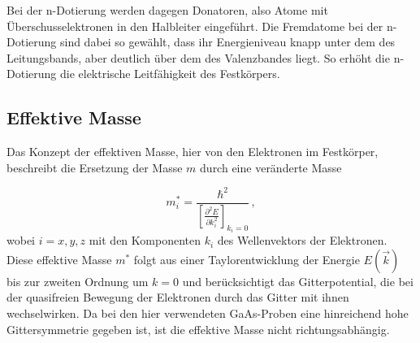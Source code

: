 Bei der n-Dotierung werden dagegen Donatoren, also Atome mit Überschusselektronen in den Halbleiter eingeführt.
Die Fremdatome bei der  n-Dotierung sind dabei so gewählt, dass ihr Energieniveau knapp unter dem des Leitungsbands,
aber deutlich über dem des Valenzbandes liegt.
So erhöht die n-Dotierung die elektrische Leitfähigkeit des Festkörpers.


\subsection{Effektive Masse}

Das Konzept der effektiven Masse, hier von den Elektronen im Festkörper, beschreibt die Ersetzung der Masse $m$ durch eine veränderte Masse

\begin{equation}
    m^*_i = \frac{\hbar^2}{\left[\frac{\partial^2 E}{\partial k^2_i} \right]_{k_i=0}} \,,
    \label{eq:effektivemasse}
\end{equation}
wobei $i = x,y,z$ mit den Komponenten $k_i$ des Wellenvektors der Elektronen.
Diese effektive Masse $m^*$ folgt aus einer Taylorentwicklung der Energie $E(\vec{k})$ bis zur zweiten Ordnung um $k=0$ und berücksichtigt das Gitterpotential,
die bei der quasifreien Bewegung der Elektronen durch das Gitter mit ihnen wechselwirken.
Da bei den hier verwendeten GaAs-Proben eine hinreichend hohe Gittersymmetrie gegeben ist, ist die effektive Masse nicht richtungsabhängig.


